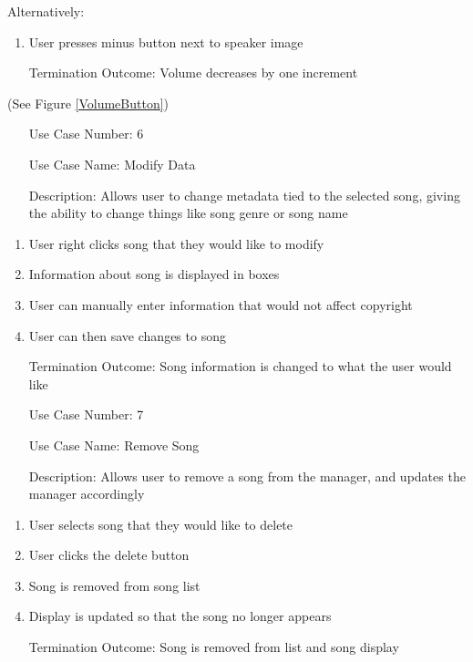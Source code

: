 \documentclass[10pt,conference,onecolumn,compsoc]{IEEEtran}
\begin{document}
Alternatively:
\begin{enumerate}
\item User presses minus button next to speaker image
\item [Termination Outcome:] Volume decreases by one increment
\end{enumerate}

(See Figure \ref{VolumeButton})

\begin{itemize}
\item[Use Case Number:] 6
\item[Use Case Name:] Modify Data
\item[Description:] Allows user to change metadata tied to the selected song, giving the ability to change things like song genre or song name
\end{itemize}

\begin{enumerate}
\item User right clicks song that they would like to modify
\item Information about song is displayed in boxes
\item User can manually enter information that would not affect copyright
\item User can then save changes to song
\item[Termination Outcome:] Song information is changed to what the user would like
\end{enumerate}

\begin{itemize}
\item[Use Case Number:] 7
\item[Use Case Name:] Remove Song
\item[Description:] Allows user to remove a song from the manager, and updates the manager accordingly
\end{itemize}

\begin{enumerate}
\item User selects song that they would like to delete
\item User clicks the delete button
\item Song is removed from song list
\item Display is updated so that the song no longer appears
\item[Termination Outcome:] Song is removed from list and song display
\end{enumerate}
\end{document}
